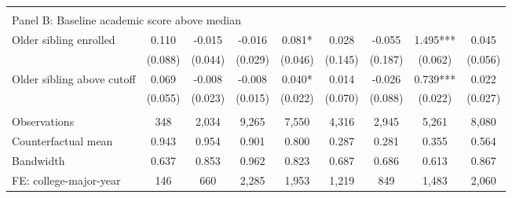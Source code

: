{{\begin{tabular}{lcccccccc}
&  &  &  & & & & & &    \\
\multicolumn{9}{l}{Panel B: Baseline academic score above median} \\
Older sibling enrolled&       0.110   &      -0.015   &      -0.016   &       0.081*  &       0.028   &      -0.055   &       1.495***&       0.045   \\
                    &     (0.088)   &     (0.044)   &     (0.029)   &     (0.046)   &     (0.145)   &     (0.187)   &     (0.062)   &     (0.056)   \\
 
Older sibling above cutoff&       0.069   &      -0.008   &      -0.008   &       0.040*  &       0.014   &      -0.026   &       0.739***&       0.022   \\
                    &     (0.055)   &     (0.023)   &     (0.015)   &     (0.022)   &     (0.070)   &     (0.088)   &     (0.022)   &     (0.027)   \\
                    &               &               &               &               &               &               &               &               \\
Observations        &         348   &       2,034   &       9,265   &       7,550   &       4,316   &       2,945   &       5,261   &       8,080   \\
Counterfactual mean &       0.943   &       0.954   &       0.901   &       0.800   &       0.287   &       0.281   &       0.355   &       0.564   \\
Bandwidth           &       0.637   &       0.853   &       0.962   &       0.823   &       0.687   &       0.686   &       0.613   &       0.867   \\
FE: college-major-year&         146   &         660   &       2,285   &       1,953   &       1,219   &         849   &       1,483   &       2,060   \\
 

\bottomrule
\end{tabular}
}
}
